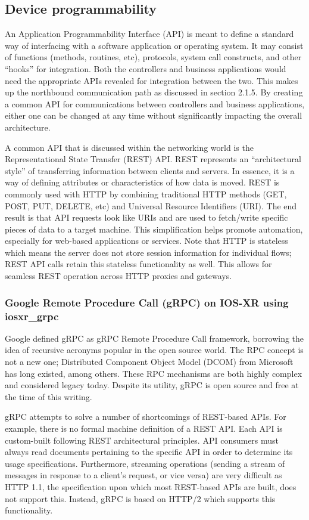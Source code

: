\subsection{Device programmability}
An Application Programmability Interface (API) is meant to define a standard
way of interfacing with a software application or operating system. It may
consist of functions (methods, routines, etc), protocols, system call
constructs, and other ``hooks'' for integration. Both the controllers and
business applications would need the appropriate APIs revealed for integration
between the two. This makes up the northbound communication path as discussed
in section 2.1.5. By creating a common API for communications between
controllers and business applications, either one can be changed at any time
without significantly impacting the overall architecture.

A common API that is discussed within the networking world is the
Representational State Transfer (REST) API\@. REST represents an ``architectural
style'' of transferring information between clients and servers. In essence, it
is a way of defining attributes or characteristics of how data is moved. REST
is commonly used with HTTP by combining traditional HTTP methods (GET, POST,
PUT, DELETE, etc) and Universal Resource Identifiers (URI). The end result is
that API requests look like URIs and are used to fetch/write specific pieces
of data to a target machine. This simplification helps promote automation,
especially for web-based applications or services. Note that HTTP is stateless
which means the server does not store session information for individual
flows; REST API calls retain this stateless functionality as well. This allows
for seamless REST operation across HTTP proxies and gateways.

\subsubsection{Google Remote Procedure Call (gRPC) on IOS-XR using iosxr\_grpc}
Google defined gRPC as gRPC Remote Procedure Call framework, borrowing the
idea of recursive acronyms popular in the open source world. The RPC concept
is not a new one; Distributed Component Object Model (DCOM) from Microsoft has
long existed, among others. These RPC mechanisms are both highly complex and
considered legacy today. Despite its utility, gRPC is open source and free at
the time of this writing.

gRPC attempts to solve a number of shortcomings of REST-based APIs. For
example, there is no formal machine definition of a REST API\@. Each API is
custom-built following REST architectural principles. API consumers must
always read documents pertaining to the specific API in order to determine its
usage specifications. Furthermore, streaming operations (sending a stream of
messages in response to a client's request, or vice versa) are very difficult
as HTTP 1.1, the specification upon which most REST-based APIs are built, does
not support this. Instead, gRPC is based on HTTP/2 which supports this
functionality.


